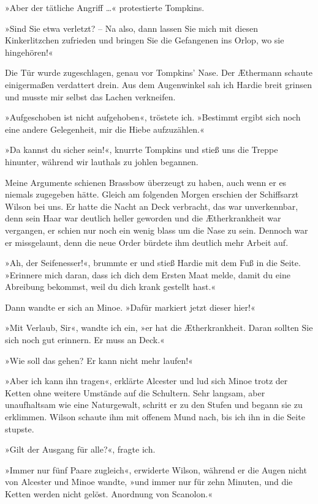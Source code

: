 »Aber der tätliche Angriff \ldots{}« protestierte Tompkins.

»Sind Sie etwa verletzt? – Na also, dann lassen Sie mich mit diesen
Kinkerlitzchen zufrieden und bringen Sie die Gefangenen ins Orlop,
wo sie hingehören!«

Die Tür wurde zugeschlagen, genau vor Tompkins’ Nase. Der Æthermann
schaute einigermaßen verdattert drein. Aus dem Augenwinkel sah ich
Hardie breit grinsen und musste mir selbst das Lachen verkneifen.

»Aufgeschoben ist nicht aufgehoben«, tröstete ich. »Bestimmt ergibt
sich noch eine andere Gelegenheit, mir die Hiebe aufzuzählen.«

»Da kannst du sicher sein!«, knurrte Tompkins und stieß uns die
Treppe hinunter, während wir lauthals zu johlen begannen.

Meine Argumente schienen Brassbow überzeugt zu haben, auch wenn er
es niemals zugegeben hätte. Gleich am folgenden Morgen erschien der
Schiffsarzt Wilson bei uns. Er hatte die Nacht an Deck verbracht,
das war unverkennbar, denn sein Haar war deutlich heller geworden
und die Ætherkrankheit war vergangen, er schien nur noch ein wenig
blass um die Nase zu sein. Dennoch war er missgelaunt, denn die
neue Order bürdete ihm deutlich mehr Arbeit auf.

»Ah, der Seifenesser!«, brummte er und stieß Hardie mit dem Fuß in
die Seite. »Erinnere mich daran, dass ich dich dem Ersten Maat
melde, damit du eine Abreibung bekommst, weil du dich krank
gestellt hast.«

Dann wandte er sich an Minoe. »Dafür markiert jetzt dieser hier!«

»Mit Verlaub, Sir«, wandte ich ein, »er hat die Ætherkrankheit.
Daran sollten Sie sich noch gut erinnern. Er muss an Deck.«

»Wie soll das gehen? Er kann nicht mehr laufen!«

»Aber ich kann ihn tragen«, erklärte Alcester und lud sich Minoe
trotz der Ketten ohne weitere Umstände auf die Schultern. Sehr
langsam, aber unaufhaltsam wie eine Naturgewalt, schritt er zu den
Stufen und begann sie zu erklimmen. Wilson schaute ihm mit offenem
Mund nach, bis ich ihn in die Seite stupste.

»Gilt der Ausgang für alle?«, fragte ich.

»Immer nur fünf Paare zugleich«, erwiderte Wilson, während er die
Augen nicht von Alcester und Minoe wandte, »und immer nur für zehn
Minuten, und die Ketten werden nicht gelöst. Anordnung von
Scanolon.«

